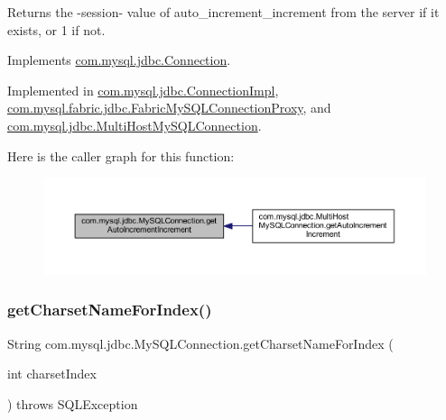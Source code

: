 Returns the -\/session-\/ value of \textquotesingle{}auto\+\_\+increment\+\_\+increment\textquotesingle{} from the server if it exists, or \textquotesingle{}1\textquotesingle{} if not. 

Implements \mbox{\hyperlink{interfacecom_1_1mysql_1_1jdbc_1_1_connection_ab681fd9ce4ce7b52529c0bea9134fc7c}{com.\+mysql.\+jdbc.\+Connection}}.



Implemented in \mbox{\hyperlink{classcom_1_1mysql_1_1jdbc_1_1_connection_impl_aa8687ff453437195ecc1ee3d3598e4a6}{com.\+mysql.\+jdbc.\+Connection\+Impl}}, \mbox{\hyperlink{classcom_1_1mysql_1_1fabric_1_1jdbc_1_1_fabric_my_s_q_l_connection_proxy_ac369523a903e1f8fb0c590a87cf2430c}{com.\+mysql.\+fabric.\+jdbc.\+Fabric\+My\+S\+Q\+L\+Connection\+Proxy}}, and \mbox{\hyperlink{classcom_1_1mysql_1_1jdbc_1_1_multi_host_my_s_q_l_connection_a4b95550806cfbdb36263ec1e37a5c971}{com.\+mysql.\+jdbc.\+Multi\+Host\+My\+S\+Q\+L\+Connection}}.

Here is the caller graph for this function\+:
\nopagebreak
\begin{figure}[H]
\begin{center}
\leavevmode
\includegraphics[width=350pt]{interfacecom_1_1mysql_1_1jdbc_1_1_my_s_q_l_connection_acb6ababcad41a91c6a44d300d09acff9_icgraph}
\end{center}
\end{figure}
\mbox{\label{interfacecom_1_1mysql_1_1jdbc_1_1_my_s_q_l_connection_a22f366874501fa1c71054ad89fc56b32}} 
\subsubsection{\texorpdfstring{get\+Charset\+Name\+For\+Index()}{getCharsetNameForIndex()}}
{\footnotesize\ttfamily String com.\+mysql.\+jdbc.\+My\+S\+Q\+L\+Connection.\+get\+Charset\+Name\+For\+Index (\begin{DoxyParamCaption}\item[{int}]{charset\+Index }\end{DoxyParamCaption}) throws S\+Q\+L\+Exception}

